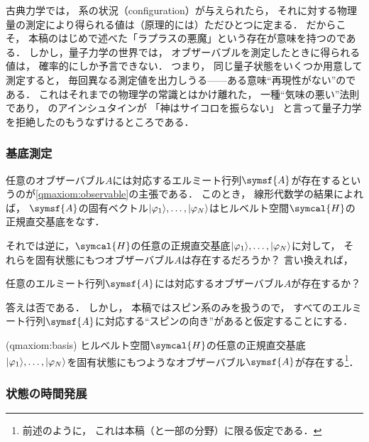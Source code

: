 \documentclass[
]{sotsu}
\begin{document}
古典力学では，
系の状況（configuration）が与えられたら，
それに対する物理量の測定により得られる値は（原理的には）ただひとつに定まる．
だからこそ，
本稿のはじめで述べた「ラプラスの悪魔」という存在が意味を持つのである．
しかし，量子力学の世界では，
オブザーバブルを測定したときに得られる値は，
確率的にしか予言できない．
つまり，
同じ量子状態をいくつか用意して測定すると，
毎回異なる測定値を出力しうる------ある意味``再現性がない''のである．
これはそれまでの物理学の常識とはかけ離れた，
一種``気味の悪い''法則であり，
のアインシュタインが
「神はサイコロを振らない」
と言って量子力学を拒絶したのもうなずけるところである．





\subsubsection{基底測定}

任意のオブザーバブル$A$には対応するエルミート行列$\symsf{A}$が存在するというのが\cref{qmaxiom:observable}の主張である．
このとき，
線形代数学の結果によれば，
$\symsf{A}$の固有ベクトル$\ket{\varphi_1}, \dots, \ket{\varphi_N}$はヒルベルト空間$\symcal{H}$の正規直交基底をなす．

それでは逆に，$\symcal{H}$の任意の正規直交基底$\ket{\varphi_1}, \dots, \ket{\varphi_N}$に対して，
それらを固有状態にもつオブザーバブル$A$は存在するだろうか？\quad 
言い換えれば，
\begin{center}
    \medskip
    任意のエルミート行列$\symsf{A}$には対応するオブザーバブル$A$が存在するか？\quad 
    \medskip
\end{center}
答えは否である．
しかし，
本稿ではスピン系のみを扱うので，
すべてのエルミート行列$\symsf{A}$に対応する``スピンの向き''があると仮定することにする．

\begin{qmaxiom}[基底測定](qmaxiom:basis)
    ヒルベルト空間$\symcal{H}$の任意の正規直交基底$\ket{\varphi_1}, \dots, \ket{\varphi_N}$を固有状態にもつようなオブザーバブル$\symsf{A}$が存在する\footnote{
        前述のように，
        これは本稿（と一部の分野）に限る仮定である．
    }．
\end{qmaxiom}





\subsubsection{状態の時間発展}
\end{document}
